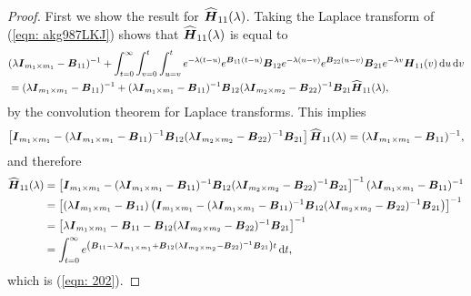 \begin{proof}
	First we show the result for \(\widehat{\boldsymbol H}_{11}(\lambda)\). Taking the Laplace transform of (\ref{eqn: akg987LKJ}) shows that \(\widehat{\boldsymbol H}_{11}(\lambda)\) is equal to 
	\begin{align}
		&(\lambda \boldsymbol I_{m_1\times m_1} - \boldsymbol B_{11})^{-1} + \int_{t=0}^\infty \int_{v=0}^t\int_{u=v}^t e^{-\lambda (t-u)}e^{\boldsymbol B_{11}(t-u)}\boldsymbol B_{12}e^{-\lambda (u-v)}e^{\boldsymbol B_{22}(u-v)}\boldsymbol B_{21}e^{-\lambda v}\boldsymbol H_{11}(v)\, \mathrm{d} u\, \mathrm{d} v \nonumber
		\\& = (\lambda \boldsymbol I_{m_1\times m_1} - \boldsymbol B_{11})^{-1} + (\lambda \boldsymbol I_{m_1\times m_1} - \boldsymbol B_{11})^{-1}\boldsymbol B_{12}(\lambda \boldsymbol I_{m_2\times m_2}-\boldsymbol B_{22})^{-1}\boldsymbol B_{21}\widehat{\boldsymbol H}_{11}(\lambda),
	\end{align}
	by the convolution theorem for Laplace transforms. This implies
	\begin{align*}
		\left[\boldsymbol I_{m_1\times m_1} -  (\lambda \boldsymbol I_{m_1\times m_1} - \boldsymbol B_{11})^{-1}\boldsymbol B_{12}(\lambda \boldsymbol I_{m_2\times m_2}-\boldsymbol B_{22})^{-1}\boldsymbol B_{21}\right]\widehat{\boldsymbol H}_{11}(\lambda) = (\lambda \boldsymbol I_{m_1\times m_1} - \boldsymbol B_{11})^{-1},
	\end{align*}
	and therefore 
	\begin{align*}
		\widehat{\boldsymbol H}_{11}(\lambda) &= \left[\boldsymbol I_{m_1\times m_1} -  (\lambda \boldsymbol I_{m_1\times m_1} - \boldsymbol B_{11})^{-1}\boldsymbol B_{12}(\lambda \boldsymbol I_{m_2\times m_2}-\boldsymbol B_{22})^{-1}\boldsymbol B_{21}\right]^{-1} (\lambda \boldsymbol I_{m_1\times m_1} - \boldsymbol B_{11})^{-1}
		\\&= \left[(\lambda \boldsymbol I_{m_1\times m_1} - \boldsymbol B_{11})\left(\boldsymbol I_{m_1\times m_1} -  (\lambda \boldsymbol I_{m_1\times m_1} - \boldsymbol B_{11})^{-1}\boldsymbol B_{12}(\lambda \boldsymbol I_{m_2\times m_2}-\boldsymbol B_{22})^{-1}\boldsymbol B_{21}\right)\right]^{-1} 
		\\&= \left[\lambda \boldsymbol I_{m_1\times m_1} - \boldsymbol B_{11} - \boldsymbol B_{12}(\lambda \boldsymbol I_{m_2\times m_2}-\boldsymbol B_{22})^{-1}\boldsymbol B_{21}\right]^{-1}
		\\&= \int_{t=0}^\infty e^{\left(\boldsymbol B_{11} - \lambda \boldsymbol I_{m_1\times m_1} + \boldsymbol B_{12}(\lambda \boldsymbol I_{m_2\times m_2}-\boldsymbol B_{22})^{-1}\boldsymbol B_{21}\right)t}\, \mathrm{d} t,
	\end{align*}
	which is (\ref{eqn: 202}). 
	

\end{proof}
